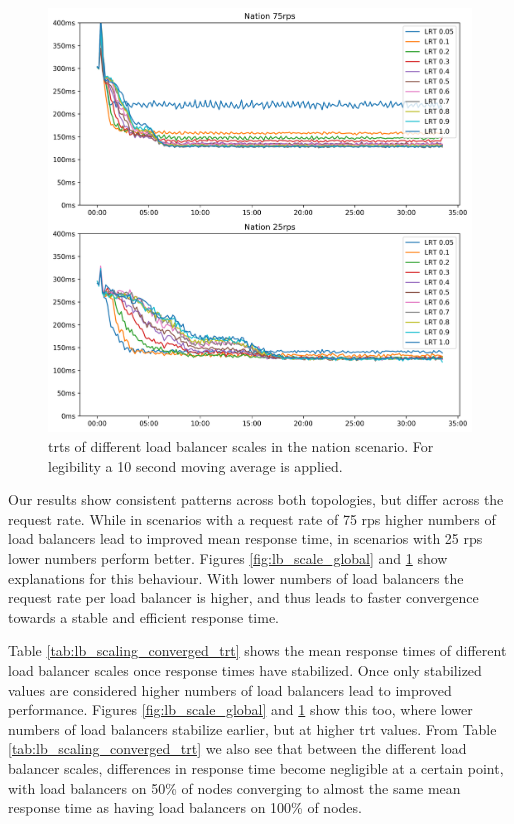 \documentclass[draft,final]{vutinfth} %
\begin{document}
\begin{figure}
    \centering
    \includegraphics[width=\linewidth]{graphics/graphs/nation_lb_scale.png}
    \caption{\glspl{trt} of different load balancer scales in the nation scenario. For legibility a 10 second moving average is applied.}
    \label{fig:lb_scale_nation}
\end{figure}

Our results show consistent patterns across both topologies, but differ across the request rate.
While in scenarios with a request rate of 75 \gls{rps} higher numbers of load balancers lead to improved mean response time, in scenarios with 25 \gls{rps} lower numbers perform better.
Figures \ref{fig:lb_scale_global} and \ref{fig:lb_scale_nation} show explanations for this behaviour.
With lower numbers of load balancers the request rate per load balancer is higher, and thus leads to faster convergence towards a stable and efficient response time.

Table \ref{tab:lb_scaling_converged_trt} shows the mean response times of different load balancer scales once response times have stabilized.
Once only stabilized values are considered higher numbers of load balancers lead to improved performance.
Figures \ref{fig:lb_scale_global} and \ref{fig:lb_scale_nation} show this too, where lower numbers of load balancers stabilize earlier, but at higher \gls{trt} values.
From Table \ref{tab:lb_scaling_converged_trt} we also see that between the different load balancer scales, differences in response time become negligible at a certain point, with load balancers on 50\% of nodes converging to almost the same mean response time as having load balancers on 100\% of nodes.
\end{document}

